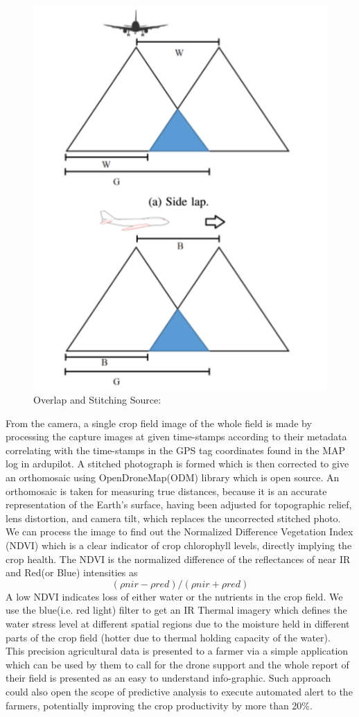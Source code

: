 \begin{figure}[H]
    \centering
    \includegraphics[width=0.7\linewidth]{SummerInterReport/project/Images-Major/overlap.png}
    \caption{Overlap and Stitching Source: \cite{one}}
    \label{fig:compEy}
\end{figure}

From the camera, a single crop field image of the whole field is made by processing the capture images at given time-stamps according to their metadata correlating with the time-stamps in the GPS tag coordinates found in the MAP log in ardupilot. A stitched photograph is formed which is then corrected to give an orthomosaic using OpenDroneMap(ODM) library which is open source. An orthomosaic is taken for measuring true distances, because it is an accurate representation of the Earth's surface, having been adjusted for topographic relief, lens distortion, and camera tilt, which replaces the uncorrected stitched photo.\\
We can process the image to find out the Normalized Difference Vegetation Index (NDVI) which is a clear indicator of crop chlorophyll levels, directly implying the crop health. The NDVI is the normalized difference of the reflectances of near IR and Red(or Blue) intensities as 
\begin{equation}
    (\rho nir - \rho red) / (\rho nir + \rho red)
\end{equation} A low NDVI indicates loss of either water or the nutrients in the crop field. We use the blue(i.e. red light) filter to get an IR Thermal imagery which defines the water stress level at different spatial regions due to the moisture held in different parts of the crop field (hotter due to thermal holding capacity of the water).
\\
This precision agricultural data is presented to a farmer via a simple application which can be used by them to call for the drone support and the whole report of their field is presented as an easy to understand info-graphic. Such approach could also open the scope of predictive analysis to execute automated alert to the farmers, potentially improving the crop productivity by more than 20\%.


